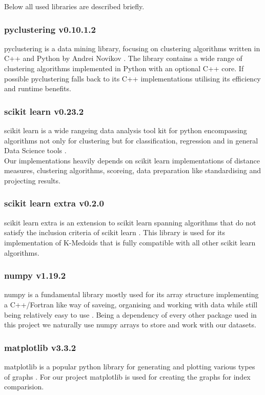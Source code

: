 Below all used libraries are described briefly.

\subsubsection[pyclustering]{pyclustering v0.10.1.2}
pyclustering is a data mining library, focusing on clustering algorithms written in C++ and Python by Andrei Novikov \cite{Novikov2019}. The library contains a wide range of clustering algorithms implemented in Python with an optional C++ core. If possible pyclustering falls back to its C++ implementations utilising its efficiency and runtime benefits.

\subsubsection[scikit learn]{scikit learn v0.23.2}
scikit learn is a wide rangeing data analysis tool kit for python encompassing algorithms not only for clustering but for classification, regression and in general Data Science tools \cite{scikitlearn}.\\
Our implementations heavily depends on scikit learn implementations of distance measures, clustering algorithms, scoreing, data preparation like standardising and projecting results. 

\subsubsection[scikit learn extra]{scikit learn extra v0.2.0}
scikit learn extra is an extension to scikit learn spanning algorithms that do not satisfy the inclusion criteria of scikit learn \cite{scikit-learn-extra}. This library is used for its implementation of K-Medoids that is fully compatible with all other scikit learn algorithms.

\subsubsection[numpy]{numpy v1.19.2}
numpy is a fundamental library mostly used for its array structure implementing a C++/Fortran like way of saveing, organising and working with data while still being relatively easy to use \cite{numpy}. Being a dependency of every other package used in this project we naturally use numpy arrays to store and work with our datasets.

\subsubsection{matplotlib v3.3.2}
matplotlib is a popular python library for generating and plotting various types of graphs \cite{Hunter:2007}. For our project matplotlib is used for creating the graphs for index comparision.

